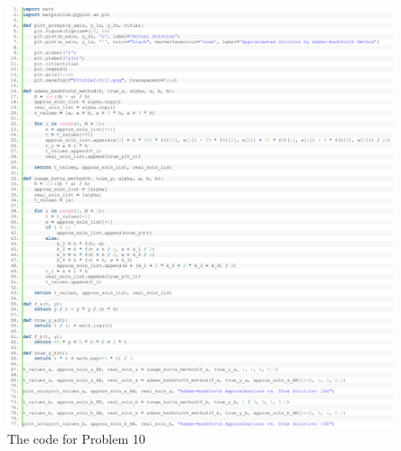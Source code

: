 \documentclass[11pt]{article}
\theoremstyle{break}
\numberwithin{equation}{theorem}
\begin{document}
\begin{center}
    \includegraphics[width=0.85\textwidth]{P10.png}\\
    The code for Problem 10
\end{center}
\end{document}
